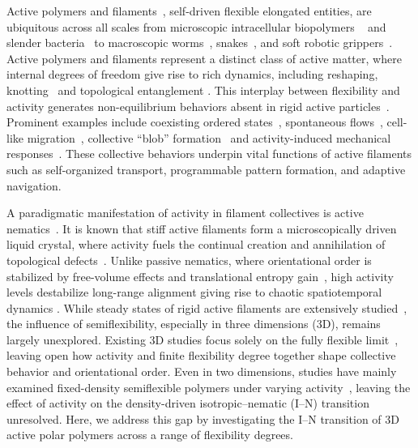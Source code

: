 \documentclass[
reprint,
superscriptaddress,
prl,









 amsmath,amssymb,
 aps,






]{revtex4-2}
\begin{document}
Active polymers and filaments~\cite{active_poly_review1,active_poly_review2}, self-driven flexible elongated entities, are ubiquitous across all scales from microscopic intracellular biopolymers  ~\cite{Keber2014,conboy2024cytoskeletal} and slender bacteria~\cite{mirabilis_Vibrio,Cyanobacteria_23} to macroscopic worms~\cite{Ozkan-Aydin2021,aquarium_worms}, snakes~\cite{Hu2009,Cohen2023}, and soft robotic grippers~\cite{Becker2022}. Active polymers and filaments represent a distinct class of active matter, where internal degrees of freedom give rise to rich dynamics, including reshaping, knotting~\cite{zhang2025_knot,Vatin_25} and topological entanglement \cite{hu2016entangled,deblais2023worm,aquarium_worms,tejedor2019reptation,Becker2022,ubertini2024universal,breoni2025giant}.
This interplay between flexibility and activity generates non-equilibrium behaviors absent in rigid active particles~\cite{Gompper2020,elgeti_physics_2015}. Prominent examples include coexisting ordered states~\cite{Huber2018}, spontaneous flows~\cite{sanchez2012spontaneous,Lemma2019}, cell-like migration~\cite{conboy2024cytoskeletal,Ozkan-Aydin2021}, collective ``blob'' formation~\cite{aquarium_worms,Patil2023} and activity-induced mechanical responses~\cite{mizuno2007nonequilibrium,koenderink2009active,alvarado2013molecular, worms_rheology,ozkan2021,kurjahn2024,conboy2025actin,breoni2025giant}. These collective behaviors underpin  vital functions of active filaments such as self-organized transport, programmable pattern formation, and adaptive navigation.

A paradigmatic manifestation of activity in filament collectives is active nematics~\cite{marchetti_hydrodynamics_2013,Doostmohammadi}. It is known that stiff active filaments form a microscopically driven liquid crystal, where activity fuels the continual creation and annihilation of topological defects~\cite{marchetti_hydrodynamics_2013,Doostmohammadi,Wensink2012,Sanchez2012,Joshi2019,dry_active}. Unlike passive nematics, where orientational order is stabilized by free-volume effects and translational entropy gain~\cite{Onsager_49,Rods_IN}, high activity levels destabilize long-range alignment   giving rise to chaotic spatiotemporal dynamics \cite{Wensink2012,thampi2016active,alert2022active,Giomi2011}. While steady states of rigid active filaments are extensively studied~\cite{Wensink2012,Ginelli2010,IN_rods,dry_active,active_rods,Mandal2020,liu2025collective}, the influence of semiflexibility, especially in three dimensions (3D), remains largely unexplored. Existing 3D studies focus solely on the fully flexible limit~\cite{ubertini2024universal,breoni2025giant,liu2025collective,active_polymer_melt_25}, leaving open how activity and  finite flexibility degree together shape collective behavior and orientational order. Even in two dimensions, studies have mainly examined fixed-density semiflexible polymers under varying activity~\cite{Prathyusha2018,Duman2018,Joshi2019}, leaving the effect of activity on the density-driven isotropic–nematic (I--N) transition unresolved. Here, we address this gap by investigating the I--N transition of 3D active polar polymers across a range of flexibility degrees.
\end{document}
